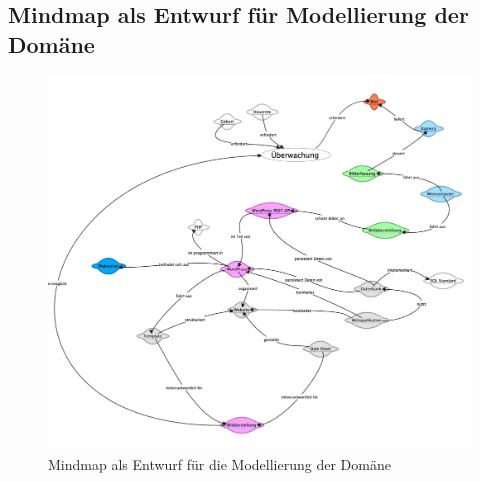 \begin{landscape}
\section{Mindmap als Entwurf für Modellierung der Domäne}
\begin{figure}[H]
	\center
	\includegraphics[scale=.09]{Grafiken/mmDomain.jpg}
	\caption{Mindmap als Entwurf für die Modellierung der Domäne }
	\label{fig: Mindmap als Entwurf die für Modellierung der Domäne}
\end{figure}
	
\end{landscape}